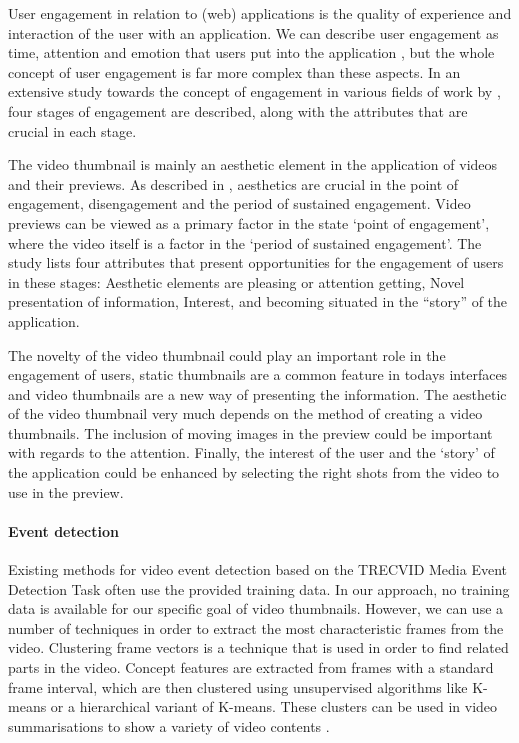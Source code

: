 \documentclass{../resources/sig-alternate-05-2015}
\begin{document}
User engagement in relation to (web) applications is the quality of experience and interaction of the user with an application. We can describe user engagement as time, attention and emotion that users put into the application \cite{Lehmann:2012ia}, but the whole concept of user engagement is far more complex than these aspects. In an extensive study towards the concept of engagement in various fields of work by \textcite{OBrien:2008km}, four stages of engagement are described, along with the attributes that are crucial in each stage.

The video thumbnail is mainly an aesthetic element in the application of videos and their previews. As described in \textcite{OBrien:2008km}, aesthetics are crucial in the point of engagement, disengagement and the period of sustained engagement. Video previews can be viewed as a primary factor in the state `point of engagement', where the video itself is a factor in the `period of sustained engagement'. The study lists four attributes that present opportunities for the engagement of users in these stages: Aesthetic elements are pleasing or attention getting, Novel presentation of information, Interest, and becoming situated in the “story” of the application.

The novelty of the video thumbnail could play an important role in the engagement of users, static thumbnails are a common feature in todays interfaces and video thumbnails are a new way of presenting the information. The aesthetic of the video thumbnail very much depends on the method of creating a video thumbnails. The inclusion of moving images in the preview could be important with regards to the attention. Finally, the interest of the user and the `story' of the application could be enhanced by selecting the right shots from the video to use in the preview.

\paragraph{Event detection}
Existing methods for video event detection based on the TRECVID Media Event Detection Task \cite{1178722} often use the provided training data. In our approach, no training data is available for our specific goal of video thumbnails. However, we can use a number of techniques in order to extract the most characteristic frames from the video. Clustering frame vectors is a technique that is used in order to find related parts in the video. Concept features are extracted from frames with a standard frame interval, which are then clustered using unsupervised algorithms like K-means or a hierarchical variant of K-means. These clusters can be used in video summarisations to show a variety of video contents \cite{Mettes:2015vg,Ajmal:2012hi}.
\end{document}
